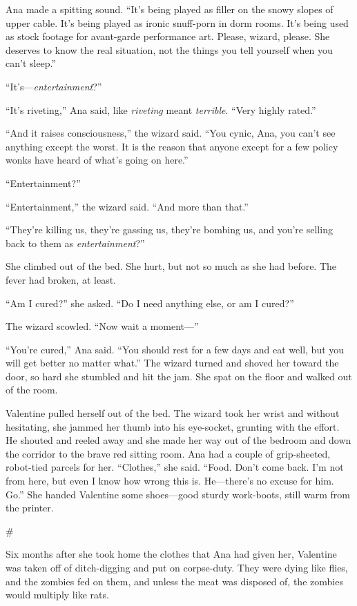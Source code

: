 Ana made a spitting sound. “It’s being played as filler on the
snowy slopes of upper cable. It’s being played as ironic snuff-porn
in dorm rooms. It’s being used as stock footage for avant-garde
performance art. Please, wizard, please. She deserves to know the
real situation, not the things you tell yourself when you can’t
sleep.”

“It’s—\emph{entertainment}?”

“It’s riveting,” Ana said, like \emph{riveting} meant
\emph{terrible}. “Very highly rated.”

“And it raises consciousness,” the wizard said. “You cynic, Ana,
you can’t see anything except the worst. It is the reason that
anyone except for a few policy wonks have heard of what’s going on
here.”

“Entertainment?”

“Entertainment,” the wizard said. “And more than that.”

“They’re killing us, they’re gassing us, they’re bombing us, and
you’re selling back to them as \emph{entertainment}?”

She climbed out of the bed. She hurt, but not so much as she had
before. The fever had broken, at least.

“Am I cured?” she asked. “Do I need anything else, or am I cured?”

The wizard scowled. “Now wait a moment—”

“You’re cured,” Ana said. “You should rest for a few days and eat
well, but you will get better no matter what.” The wizard turned
and shoved her toward the door, so hard she stumbled and hit the
jam. She spat on the floor and walked out of the room.

Valentine pulled herself out of the bed. The wizard took her wrist
and without hesitating, she jammed her thumb into his eye-socket,
grunting with the effort. He shouted and reeled away and she made
her way out of the bedroom and down the corridor to the brave red
sitting room. Ana had a couple of grip-sheeted, robot-tied parcels
for her. “Clothes,” she said. “Food. Don’t come back. I’m not from
here, but even I know how wrong this is. He—there’s no excuse for
him. Go.” She handed Valentine some shoes—good sturdy work-boots,
still warm from the printer.

\#

Six months after she took home the clothes that Ana had given her,
Valentine was taken off of ditch-digging and put on corpse-duty.
They were dying like flies, and the zombies fed on them, and unless
the meat was disposed of, the zombies would multiply like rats.

